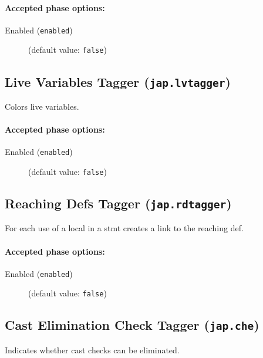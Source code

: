 \documentclass{article}
\begin{document}
\paragraph{Accepted phase options:} 

\begin{description}

\item[Enabled ({\tt enabled})]
(default value: {\tt false})






\end{description}

\subsection{Live Variables Tagger ({\tt jap.lvtagger})}
Colors live variables.

\paragraph{Accepted phase options:} 

\begin{description}

\item[Enabled ({\tt enabled})]
(default value: {\tt false})






\end{description}

\subsection{Reaching Defs Tagger ({\tt jap.rdtagger})}
For each use of a local in a stmt creates a link to the reaching def.

\paragraph{Accepted phase options:} 

\begin{description}

\item[Enabled ({\tt enabled})]
(default value: {\tt false})






\end{description}

\subsection{Cast Elimination Check Tagger ({\tt jap.che})}
Indicates whether cast checks can be eliminated.
\end{document}
